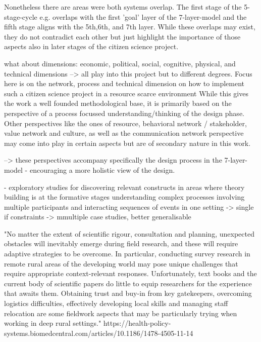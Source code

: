 Nonetheless there are areas were both systems overlap. The first stage of the 5-stage-cycle e.g. overlaps with the first 'goal' layer of the 7-layer-model and the fifth stage aligns with the 5th,6th, and 7th layer. While these overlaps may exist, they do not contradict each other but just highlight the importance of those aspects also in later stages of the citizen science project.

what about dimensions: economic, political, social, cognitive, physical, and technical dimensions
--> all play into this project but to different degrees. Focus here is on the network, process and technical dimension on how to implement such a citizen science project in a resource scarce environment
While this gives the work a well founded methodological base, it is primarily based on the perspective of a process focussed understanding/thinking of the design phase. Other perspectives like the ones of resource, behavioral network / stakeholder, value network and culture, as well as the communication network perspective may come into play in certain aspects but are of secondary nature in this work.

--> these perspectives accompany specifically the design process in the 7-layer-model - encouraging a more holistic view of the design.




- exploratory studies for discovering relevant constructs in areas where theory building is at the formative stages
understanding complex processes involving multiple participants and interacting sequences of events in one setting
-> single if constraints -> mmultiple case studies, better generalisable


"No matter the extent of scientific rigour, consultation and planning, unexpected obstacles will inevitably emerge during field research, and these will require adaptive strategies to be overcome. In particular, conducting survey research in remote rural areas of the developing world may pose unique challenges that require appropriate context-relevant responses. Unfortunately, text books and the current body of scientific papers do little to equip researchers for the experience that awaits them. Obtaining trust and buy-in from key gatekeepers, overcoming logistics difficulties, effectively developing local skills and managing staff relocation are some fieldwork aspects that may be particularly trying when working in deep rural settings."
https://health-policy-systems.biomedcentral.com/articles/10.1186/1478-4505-11-14

